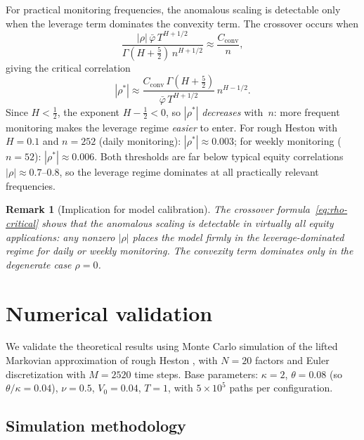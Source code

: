 \documentclass[12pt]{article}
\newtheorem{remark}{Remark}
\theoremstyle{definition}
\begin{document}
For practical monitoring frequencies, the anomalous scaling is
detectable only when the leverage term dominates the convexity term.
The crossover occurs when
\[
  \frac{|\rho|\,\bar\varphi\,T^{H+1/2}}
  {\Gamma(H+\tfrac52)\,n^{H+1/2}}
  \approx \frac{C_{\mathrm{conv}}}{n},
\]
giving the critical correlation
\begin{equation}\label{eq:rho-critical}
  |\rho^*| \approx
  \frac{C_{\mathrm{conv}}\,\Gamma(H+\tfrac52)}
  {\bar\varphi\,T^{H+1/2}}\,n^{H-1/2}.
\end{equation}
Since $H < \tfrac12$, the exponent $H - \tfrac12 < 0$, so
$|\rho^*|$ \emph{decreases} with~$n$: more frequent monitoring
makes the leverage regime \emph{easier} to enter.
For rough Heston with $H = 0.1$ and $n = 252$ (daily monitoring):
$|\rho^*| \approx 0.003$; for weekly monitoring ($n = 52$):
$|\rho^*| \approx 0.006$.
Both thresholds are far below typical equity correlations
$|\rho| \approx 0.7$--$0.8$, so the leverage regime dominates
at all practically relevant frequencies.

\begin{remark}[Implication for model calibration]
The crossover formula~\eqref{eq:rho-critical} shows that
the anomalous scaling is detectable in virtually all equity
applications: any nonzero $|\rho|$ places the model firmly in
the leverage-dominated regime for daily or weekly monitoring.
The convexity term dominates only in the degenerate case
$\rho = 0$.
\end{remark}

\section{Numerical validation}\label{sec:numerics}

We validate the theoretical results using Monte Carlo simulation
of the lifted Markovian approximation of rough Heston
\citep{AbiJaberElEuch2019}, with $N = 20$ factors and Euler
discretization with $M = 2520$ time steps.
Base parameters:
$\kappa = 2$, $\theta = 0.08$ (so $\theta/\kappa = 0.04$),
$\nu = 0.5$, $V_0 = 0.04$, $T = 1$, with $5 \times 10^5$
paths per configuration.

\subsection{Simulation methodology}\label{sec:sim-method}
\end{document}
